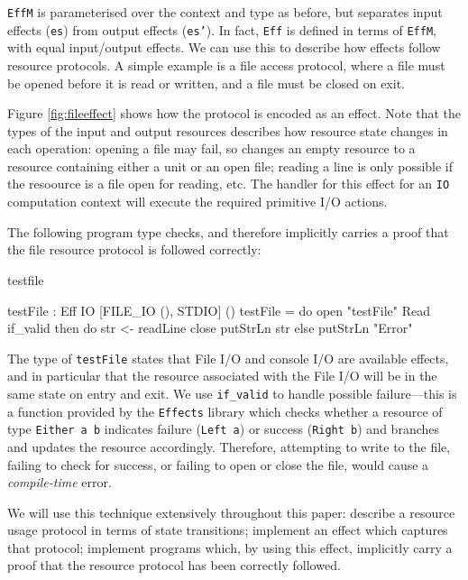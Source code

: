 \noindent
\texttt{EffM} is parameterised over the context and type as before, but
separates input effects (\texttt{es}) from output effects (\texttt{es'}). 
In fact, \texttt{Eff}
is defined in terms of \texttt{EffM}, with equal input/output effects.
We can use this to describe how effects follow resource protocols. A simple
example is a file access protocol, where a file must be opened before it
is read or written, and a file must be closed on exit. 

Figure \ref{fig:fileeffect} shows how the protocol is encoded as an
effect.
Note that the types of the input and output resources describes how resource
state changes in each operation: opening a file may fail, so
changes an empty resource to
a resource containing either a unit or an open file; 
reading a line is only possible if the
resoource is a file open for reading, etc.
The handler for this effect for an \texttt{IO} computation context will
execute the required primitive I/O actions.

The following program type checks, and therefore implicitly carries 
a proof that the file resource protocol is followed correctly:

\begin{SaveVerbatim}{testfile}

testFile : Eff IO [FILE_IO (), STDIO] () 
testFile = do open "testFile" Read
              if_valid then do str <- readLine
                            close
                            putStrLn str
                       else putStrLn "Error"

\end{SaveVerbatim}

\noindent
The type of \texttt{testFile} states
that File I/O and console I/O are available effects, and in particular that
the resource associated with the File I/O will be in the same state on entry
and exit. We use \texttt{if\_valid} to handle possible failure---this is
a function provided by the \texttt{Effects} library which checks whether
a resource of type \texttt{Either a b} indicates failure (\texttt{Left a})
or success (\texttt{Right b}) and branches and updates the resource
accordingly.
Therefore, attempting to write to the file, failing to check for
success, or failing to open or close the
file, would cause a \emph{compile-time} error. 

We will use this technique extensively
throughout this paper: describe a resource usage protocol in terms of
state transitions; implement an effect which captures that protocol; implement
programs which, by using this effect, implicitly carry a proof that the resource
protocol has been correctly followed.


